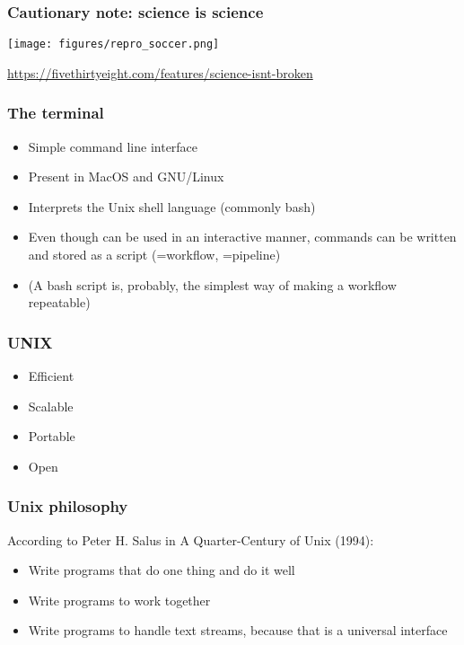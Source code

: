 \documentclass{beamer}
\begin{document}
\begin{frame}
  \frametitle{Cautionary note: science is science}
\centering
\texttt{[image: figures/repro\_soccer.png]}

{\tiny \url{https://fivethirtyeight.com/features/science-isnt-broken}}
\end{frame}


\begin{frame}
  \frametitle{The terminal}
  \begin{itemize}
    
  \item Simple command line interface 
  \item Present in MacOS and GNU/Linux
  \item Interprets the Unix shell language (commonly bash)
  \item Even though can be used in an interactive manner, commands can be written and stored as a script (=workflow, =pipeline)
  \item (A bash script is, probably, the simplest way of making a workflow repeatable)
  \end{itemize}

\end{frame}


\begin{frame}
  \frametitle{UNIX}
  \begin{itemize}
  \item Efficient
  \item Scalable
  \item Portable
  \item Open
  \end{itemize}
\end{frame}


\begin{frame}
  \frametitle{Unix philosophy}
According to Peter H. Salus in A Quarter-Century of Unix (1994):
  \begin{itemize}
  \item Write programs that do one thing and do it well
  \item Write programs to work together
  \item Write programs to handle text streams, because that is a universal interface
  \end{itemize}
\end{frame}
\end{document}
